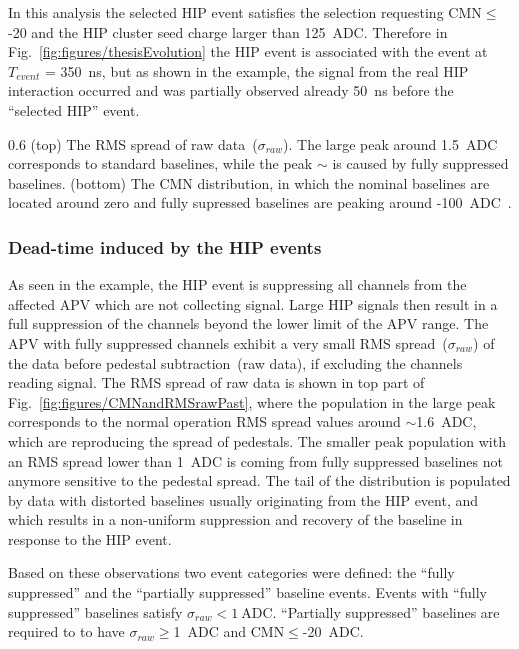 In this analysis the selected HIP event satisfies the selection requesting CMN$\leq$-20 and the HIP cluster seed charge larger than 125~ADC. Therefore in Fig.~\ref{fig:figures/thesisEvolution} the HIP event is associated with the event at $T_{event}$ = 350~ns, but as shown in the example, the signal from the real HIP interaction occurred and was partially observed already 50~ns before the ``selected HIP'' event.

                 {0.6}       %
                 {(top) The RMS spread of raw data~($\sigma_{raw}$). The large peak around 1.5~ADC corresponds to standard baselines, while the peak $\sim$ is caused by fully suppressed baselines. (bottom) The CMN distribution, in which the nominal baselines are located around zero and fully supressed baselines are peaking around -100~ADC~\cite{Bainbridge:2004jc}.} %



\subsubsection{Dead-time induced by the HIP events}

As seen in the example, the HIP event is suppressing all channels from the affected APV which are not collecting signal. Large HIP signals then result in a full suppression of the channels beyond the lower limit of the APV range. The APV with fully suppressed channels exhibit a very small RMS spread~($\sigma_{raw}$) of the data before pedestal subtraction~(raw data), if excluding the channels reading signal. The RMS spread of raw data is shown in top part of Fig.~\ref{fig:figures/CMNandRMSrawPast}, where the population in the large peak corresponds to the normal operation RMS spread values around $\sim$1.6~ADC, which are reproducing the spread of pedestals. The smaller peak population with an RMS spread lower than 1~ADC is coming from fully suppressed baselines not anymore sensitive to the pedestal spread. The tail of the distribution is populated by data with distorted baselines usually originating from the HIP event, and which results in a non-uniform suppression and recovery of the baseline in response to the HIP event.

Based on these observations two event categories were defined: the ``fully suppressed'' and the ``partially suppressed'' baseline events. Events with ``fully suppressed'' baselines satisfy $\sigma_{raw}< 1~\mathrm{ADC}$. ``Partially suppressed'' baselines are required to to have $\sigma_{raw}\geq$1~ADC and CMN$\leq$-20~ADC.


